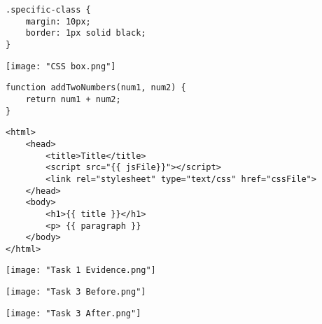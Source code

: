 \documentclass[12pt]{report}
\def\lthtmlcheckvsize{\ifdim\ht\sizebox<\vsize 
  \ifdim\wd\sizebox<\hsize\expandafter\hfill\fi \expandafter\vfill
  \else\expandafter\vss\fi}%
\begin{document}
{\newpage\clearpage
{}%
\begin{lstlisting}
.specific-class {
	margin: 10px;
	border: 1px solid black;
}
					\end{lstlisting}%
\lthtmlfigureZ
\lthtmlcheckvsize\clearpage}

{\newpage\clearpage
{}%
\texttt{[image: "CSS box.png"]}%
\lthtmlpictureZ
\lthtmlcheckvsize\clearpage}

{\newpage\clearpage
{}%
\begin{lstlisting}
function addTwoNumbers(num1, num2) {
	return num1 + num2;
}
					\end{lstlisting}%
\lthtmlfigureZ
\lthtmlcheckvsize\clearpage}

{\newpage\clearpage
{}%
\begin{lstlisting}
<html>
	<head>
		<title>Title</title>
		<script src="{{ jsFile}}"></script>
		<link rel="stylesheet" type="text/css" href="cssFile">
	</head>
	<body>
		<h1>{{ title }}</h1>
		<p> {{ paragraph }}
	</body>
</html>
					\end{lstlisting}%
\lthtmlfigureZ
\lthtmlcheckvsize\clearpage}

{\newpage\clearpage
{}%
\texttt{[image: "Task 1 Evidence.png"]}%
\lthtmlpictureZ
\lthtmlcheckvsize\clearpage}

{\newpage\clearpage
{}%
\texttt{[image: "Task 3 Before.png"]}%
\lthtmlpictureZ
\lthtmlcheckvsize\clearpage}

{\newpage\clearpage
{}%
\texttt{[image: "Task 3 After.png"]}%
\lthtmlpictureZ
\lthtmlcheckvsize\clearpage}
\end{document}
